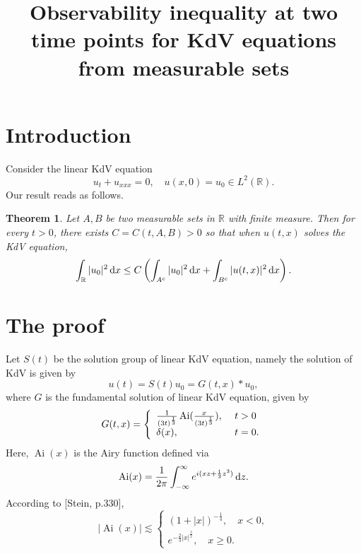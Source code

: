 \documentclass[12pt]{amsart}
\title[Observability inequality ]
{ \bf
 Observability inequality at two time points for KdV equations from measurable sets}
\author[ ]
{    }
\def\R {\mathbb{R}}
\def\d{{\,\rm d}}
\newtheorem{theorem}[proposition]{Theorem}
\theoremstyle{definition}
\numberwithin{equation}{section}
\begin{document}
\begin{abstract}


\end{abstract}

\maketitle


\section{Introduction}
Consider the linear KdV equation
$$
u_t+u_{xxx}=0, \quad u(x,0)=u_0\in L^2(\R).
$$
Our result reads as follows.
\begin{theorem}\label{thm-1}
Let $A,B$ be two measurable sets in $\R$ with finite measure. Then for every $t>0$, there exists $C=C(t,A,B)>0$ so that when $u(t,x)$ solves the KdV equation,
$$
\int_\R |u_0|^2\d x \leq C\left( \int_{A^c}|u_0|^2\d x + \int_{B^c}|u(t,x)|^2\d x \right).
$$
\end{theorem}

\section{The proof}

Let $S(t)$ be the solution group of linear KdV equation, namely the solution of KdV is given by
$$
u(t)=S(t)u_0=G(t,x)*u_0,
$$
where $G$ is the fundamental solution of linear KdV equation, given by
\begin{align*}
G(t,x)= \left\{
               \begin{array}{ll}
               \frac{1}{(3t)^{\frac{1}{3}}}\operatorname{Ai}(\frac{x}{(3t)^{\frac{1}{3}}}), & \hbox{ }t>0 \\
                                                   \delta(x), & \hbox{ }t=0.
                                                 \end{array}
                                               \right.
\end{align*}
Here, $\operatorname{Ai}(x)$ is the Airy function defined via
\begin{align*}
\operatorname{Ai}(x)= \frac{1}{2\pi}\int^{\infty}_{-\infty}e^{i(xz+\frac{1}{3}z^3)}\d z.
\end{align*}
According to [Stein, p.330],
$$|\operatorname{Ai}(x)| \lesssim
\begin{cases}
(1+|x|)^{-\frac{1}{4}}, \quad x<0, \\
 e^{-\frac{2}{3}|x|^{\frac{3}{2}}}, \quad x\geq 0.
\end{cases}
$$
\end{document}
